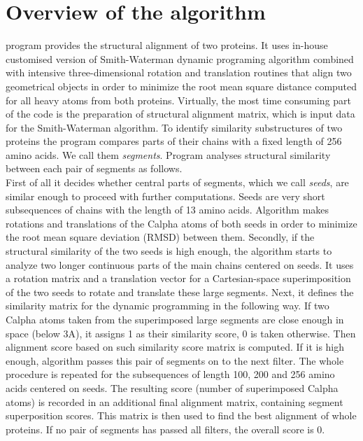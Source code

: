 \section{Overview of the algorithm}
\prog{} program provides the structural alignment of two proteins.
It uses in-house customised version of Smith-Waterman dynamic programing
algorithm combined with intensive three-dimensional rotation and translation
routines that align two geometrical objects in order to minimize the root mean square
distance computed for all heavy atoms from both proteins.
Virtually, the most time consuming part of the code is the preparation of structural
alignment matrix, which is input data for the Smith-Waterman algorithm.
To identify similarity substructures of two proteins the program compares
parts of their chains with a fixed length of 256 amino acids.
We call them \emph{segments}.
Program analyses structural similarity between each pair of segments as follows.\\
First of all it decides whether central parts of segments, which we call
\emph{seeds}, are similar enough to proceed with further computations.
Seeds are very short subsequences of chains with the length of 13 amino acids.
Algorithm makes rotations and translations of the Calpha atoms of both seeds in
order to minimize the root mean square deviation (RMSD) between them.
Secondly, if the structural similarity of the two seeds is high enough,
the algorithm starts to analyze two longer continuous parts of the main chains
centered on seeds.
It uses a rotation matrix and a translation vector for a Cartesian-space
superimposition of the two seeds to rotate and translate these large segments.
Next, it defines the similarity matrix for the dynamic programming in the
following way.
If two Calpha atoms taken from the superimposed large segments are close enough
in space (below 3A), it assigns 1 as their similarity score, 0 is taken
otherwise.
Then alignment score based on such similarity score matrix is computed.
If it is high enough, algorithm passes this pair of segments
on to the next filter.
The whole procedure is repeated for the subsequences of length 100, 200 and 256
amino acids centered on seeds.
The resulting score (number of superimposed Calpha atoms) is recorded in an
additional final alignment matrix, containing segment superposition scores.
This matrix is then used to find the best alignment of whole proteins.
If no pair of segments has passed all filters, the overall score is 0.

